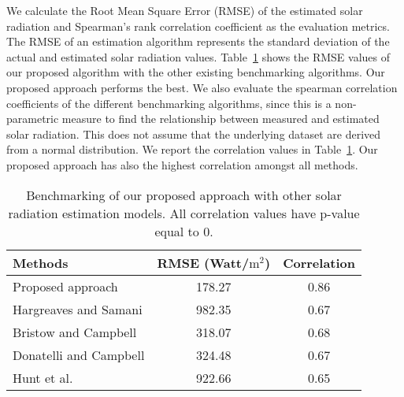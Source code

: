 We calculate the Root Mean Square Error (RMSE) of the estimated solar radiation and Spearman's rank correlation coefficient as the evaluation metrics. The RMSE of an estimation algorithm represents the standard deviation of the actual and estimated solar radiation values. Table~\ref{tab:corr_results} shows the RMSE values of our proposed algorithm with the other existing benchmarking algorithms. Our proposed approach performs the best. We also evaluate the spearman correlation coefficients of the different benchmarking algorithms, since this is a non-parametric measure to find the relationship between measured and estimated solar radiation. This does not assume that the underlying dataset are derived from a normal distribution. We report the correlation values in Table~\ref{tab:corr_results}. Our proposed approach has also the highest correlation amongst all methods. 

\begin{table}[htb]
\normalsize
\centering
\begin{tabular}{l|c|c}
\hline
\textbf{Methods} & \textbf{RMSE} (Watt/$\mbox{m}^2$) & \textbf{Correlation}\\
\hline 
Proposed approach & 178.27 & 0.86\\
Hargreaves and Samani & 982.35 & 0.67\\
Bristow and Campbell & 318.07 & 0.68\\
Donatelli and Campbell & 324.48 & 0.67\\
Hunt et al.\ & 922.66  & 0.65\\
\hline
\end{tabular}
\caption[Benchmarking of our proposed approach with other solar radiation estimation models.]{Benchmarking of our proposed approach with other solar radiation estimation models. All correlation values have p-value equal to $0$.}
\label{tab:corr_results}
\end{table}

